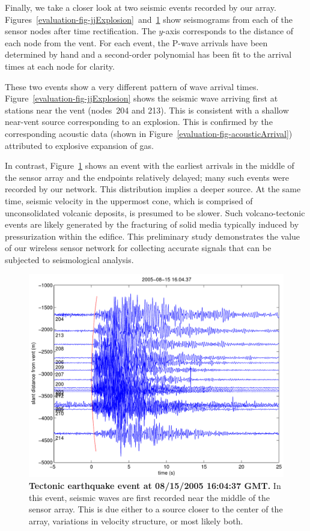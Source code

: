 Finally, we take a closer look at two seismic events recorded by our array.
Figures~\ref{evaluation-fig-jjExplosion}~and~\ref{evaluation-fig-jjTectonic}
show seismograms from each of the sensor nodes after time rectification.  The
$y$-axis corresponds to the distance of each node from the vent.  For each
event, the P-wave arrivals have been determined by hand and a second-order
polynomial has been fit to the arrival times at each node for clarity.

These two events show a very different pattern of wave arrival times.
Figure~\ref{evaluation-fig-jjExplosion} shows the seismic wave arriving first
at stations near the vent (nodes~204 and 213). This is consistent with a
shallow near-vent source corresponding to an explosion. This is confirmed by
the corresponding acoustic data (shown in
Figure~\ref{evaluation-fig-acousticArrival}) attributed to explosive
expansion of gas. 

In contrast, Figure~\ref{evaluation-fig-jjTectonic} shows an event with the
earliest arrivals in the middle of the sensor array and the endpoints
relatively delayed; many such events were recorded by our network.  This
distribution implies a deeper source.  At the same time, seismic velocity in
the uppermost cone, which is comprised of unconsolidated volcanic deposits,
is presumed to be slower.  Such volcano-tectonic events are likely generated
by the fracturing of solid media typically induced by pressurization within
the edifice. This preliminary study demonstrates the value of our wireless
sensor network for collecting accurate signals that can be subjected to
seismological analysis.

\begin{figure}[t]
\label{evaluation-fig-jjTectonic}
\begin{center}
\includegraphics[width=\hsize]{./5-evaluation/figs/fidelity/seismicArrival/johnson/2005-08-15_16-04-37.pdf}
\end{center}
\caption{\textbf{Tectonic earthquake event at 08/15/2005 16:04:37 GMT.}
In this event, seismic waves are first recorded near the middle of the sensor
array. This is due either to a source closer to the center of the array,
variations in velocity structure, or most likely both.}
\end{figure}


